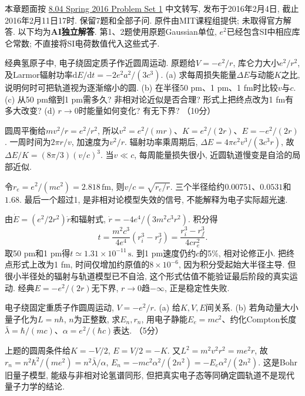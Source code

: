 \label{ch:ps1}
本章题面按 \href{https://ocw.mit.edu/courses/8-04-quantum-physics-i-spring-2016/resources/mit8_04s16_ps1_2016/}{8.04 Spring 2016 Problem Set 1} 中文转写, 发布于2016年2月4日, 截止2016年2月11日17时. 保留7题和全部子问. 原件由MIT课程组提供; 未取得官方解答. 以下均为\textbf{AI独立解答}. 第1、2题使用原题Gaussian单位, $e^2$已经包含SI中相应库仑常数; 不直接将SI电荷数值代入这些式子.

\begin{exercise}
经典氢原子中, 电子绕固定质子作近圆周运动. 原题给$V=-e^2/r$, 库仑力大小$e^2/r^2$, 及Larmor辐射功率$\mathrm dE/\mathrm dt=-2e^2a^2/(3c^3)$.
(a) 求每周损失能量$\Delta E$与动能$K$之比, 说明何时可把轨道视为逐渐缩小的圆.
(b) 在半径50 pm、1 pm、1 fm时比较$v$与$c$.
(c) 从50 pm缩到1 pm需多久? 非相对论近似是否合理? 形式上把终点改为1 fm有多大改变?
(d) $r\to0$时能量如何变化? 有无下界? （10分）
\end{exercise}
\begin{solution}
圆周平衡给$mv^2/r=e^2/r^2$, 所以$v^2=e^2/(mr)$、$K=e^2/(2r)$、$E=-e^2/(2r)$. 一周时间为$2\pi r/v$, 加速度为$v^2/r$. 辐射功率乘周期后,
$\Delta E=4\pi e^2v^3/(3c^3r)$, 故$\Delta E/K=(8\pi/3)(v/c)^3$. 当$v\ll c$, 每周能量损失很小, 近圆轨道慢变是自洽的局部近似.

令$r_e=e^2/(mc^2)=2.818\,\mathrm{fm}$, 则$v/c=\sqrt{r_e/r}$. 三个半径给约$0.00751$、$0.0531$和$1.68$. 最后一个超过1, 是非相对论模型失效的信号, 不能解释为电子实际超光速.

由$\dot E=(e^2/2r^2)\dot r$和辐射式, $\dot r=-4e^4/(3m^2c^3r^2)$. 积分得
\[
t=\frac{m^2c^3}{4e^4}(r_i^3-r_f^3)
=\frac{r_i^3-r_f^3}{4cr_e^2}.
\]
取50 pm和1 pm得$t\simeq1.31\times10^{-11}\,\mathrm s$. 到1 pm速度仍约$c$的5\%, 相对论修正小. 把终点形式上改为1 fm, 时间仅增加约原值的$8\times10^{-6}$, 因为积分受起始大半径主导. 但很小半径处的辐射与轨道模型已不自洽, 这个形式估值不能验证最后阶段的真实运动. 经典$E=-e^2/(2r)$无下界, $r\to0$趋$-\infty$, 正是稳定性失败.
\end{solution}

\begin{exercise}
电子绕固定重质子作圆周运动, $V=-e^2/r$.
(a) 给$K,V,E$间关系.
(b) 若角动量大小量子化为$L=n\hbar$, $n$为正整数, 求$E_n,r_n$, 用电子静能$E_e=mc^2$、约化Compton长度$\bar\lambda=\hbar/(mc)$、$\alpha=e^2/(\hbar c)$表达. （5分）
\end{exercise}
\begin{solution}
上题的圆周条件给$K=-V/2$, $E=V/2=-K$. 又$L^2=m^2v^2r^2=me^2r$, 故$r_n=n^2\hbar^2/(me^2)=n^2\bar\lambda/\alpha$, $E_n=-mc^2\alpha^2/(2n^2)=-E_e\alpha^2/(2n^2)$. 这是Bohr旧量子模型, 能级与非相对论氢谱同形, 但把真实电子态等同确定圆轨道不是现代量子力学的结论.
\end{solution}

